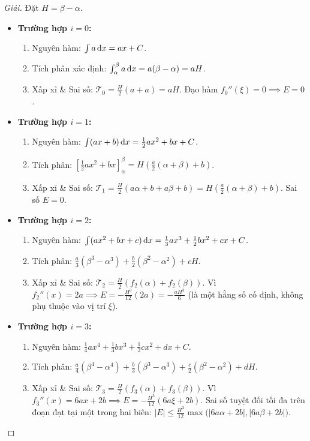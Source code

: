 \documentclass{article}
\begin{document}
\begin{proof}[Giải]
	Đặt $H = \beta - \alpha$.
	\begin{itemize}
		\item \textbf{Trường hợp $i = 0$:}
		\begin{enumerate}[label=(\alph*)]
			\item Nguyên hàm: $\int a \,{\rm d}x = ax + C$.
			\item Tích phân xác định: $\int_\alpha^\beta a \,{\rm d}x = a(\beta-\alpha) = aH$.
			\item Xấp xỉ \& Sai số: $\mathcal{T}_0 = \frac{H}{2}(a+a) = aH$. Đạo hàm $f_0''(\xi) = 0 \implies E = 0$.
		\end{enumerate}
		\item \textbf{Trường hợp $i = 1$:}
		\begin{enumerate}[label=(\alph*)]
			\item Nguyên hàm: $\int (ax+b)\,{\rm d}x = \frac{1}{2}ax^2+bx+C$.
			\item Tích phân: $\left[\frac{1}{2}ax^2+bx\right]_\alpha^\beta = H \left(\frac{a}{2}(\alpha+\beta)+b\right)$.
			\item Xấp xỉ \& Sai số: $\mathcal{T}_1 = \frac{H}{2}(a\alpha+b+a\beta+b) = H \left(\frac{a}{2}(\alpha+\beta)+b\right)$. Sai số $E = 0$.
		\end{enumerate}
		\item \textbf{Trường hợp $i = 2$:}
		\begin{enumerate}[label=(\alph*)]
			\item Nguyên hàm: $\int (ax^2+bx+c)\,{\rm d}x = \frac{1}{3}ax^3+\frac{1}{2}bx^2+cx+C$.
			\item Tích phân: $\frac{a}{3}(\beta^3-\alpha^3) + \frac{b}{2}(\beta^2-\alpha^2) + cH$.
			\item Xấp xỉ \& Sai số: $\mathcal{T}_2 = \frac{H}{2}(f_2(\alpha)+f_2(\beta))$. Vì $f_2''(x) = 2a \implies E = -\frac{H^3}{12}(2a) = -\frac{aH^3}{6}$ (là một hằng số cố định, không phụ thuộc vào vị trí $\xi$).
		\end{enumerate}
		\item \textbf{Trường hợp $i = 3$:}
		\begin{enumerate}[label=(\alph*)]
			\item Nguyên hàm: $\frac{1}{4}ax^4+\frac{1}{3}bx^3+\frac{1}{2}cx^2+dx+C$.
			\item Tích phân: $\frac{a}{4}(\beta^4-\alpha^4) + \frac{b}{3}(\beta^3-\alpha^3) + \frac{c}{2}(\beta^2-\alpha^2) + dH$.
			\item Xấp xỉ \& Sai số: $\mathcal{T}_3 = \frac{H}{2}(f_3(\alpha)+f_3(\beta))$. Vì $f_3''(x) = 6ax+2b \implies E = -\frac{H^3}{12}(6a\xi+2b)$. Sai số tuyệt đối tối đa trên đoạn đạt tại một trong hai biên: $|E| \le \frac{H^3}{12}\max\big(|6a\alpha+2b|, |6a\beta+2b|\big)$.
		\end{enumerate}
	\end{itemize}
\end{proof}
\end{document}
